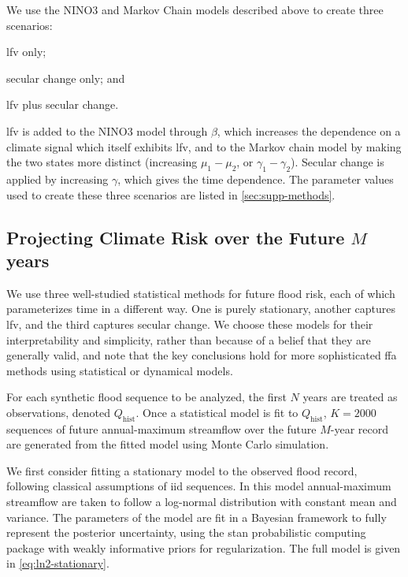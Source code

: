 \documentclass[
  draft,
  linenumbers
]{agujournal2018}
\begin{document}
We use the NINO3 and Markov Chain models described above to create three scenarios:
\begin{enumerate*}[label= (\roman*)]
  \item \gls{lfv} only;
  \item secular change only; and
  \item \gls{lfv} plus secular change.
\end{enumerate*}
\gls{lfv} is added to the NINO3 model through $\beta$, which increases the dependence on a climate signal which itself exhibits \gls{lfv}, and to the Markov chain model by making the two states more distinct (increasing $\mu_1 - \mu_2$, or $\gamma_1 - \gamma_2$).
Secular change is applied by increasing $\gamma$, which gives the time dependence.
The parameter values used to create these three scenarios are listed in \cref{sec:supp-methods}.

\subsection{Projecting Climate Risk over the Future $M$ years}\label{sec:methods-estimating}


We use three well-studied statistical methods for future flood risk, each of which parameterizes time in a different way.
One is purely stationary, another captures \gls{lfv}, and the third captures secular change.
We choose these models for their interpretability and simplicity, rather than because of a belief that they are generally valid, and note that the key conclusions hold for more sophisticated \gls{ffa} methods using statistical or dynamical models.

For each synthetic flood sequence to be analyzed, the first $N$ years are treated as observations, denoted $Q_{\text{hist}}$.
Once a statistical model is fit to $Q_{\text{hist}}$, $K=\num{2000}$ sequences of future annual-maximum streamflow over the future $M$-year record are generated from the fitted model using Monte Carlo simulation.

We first consider fitting a stationary model to the observed flood record, following classical assumptions of \gls{iid} sequences.
In this model annual-maximum streamflow are taken to follow a log-normal distribution with constant mean and variance.
The parameters of the model are fit  in a Bayesian framework to fully represent the posterior uncertainty, using the stan probabilistic computing package \citep{Carpenter:2017ke} with weakly informative priors for regularization.
The full model is given in \cref{eq:ln2-stationary}.
\end{document}
